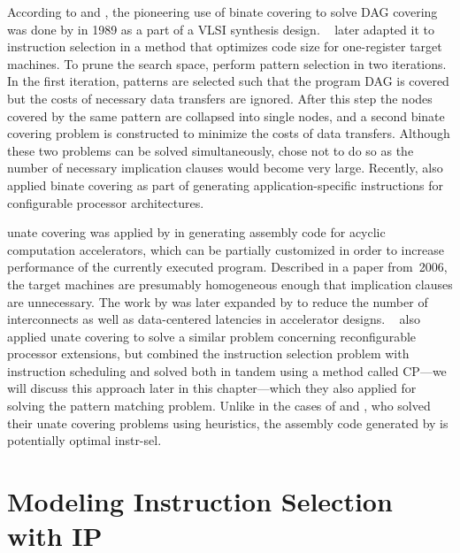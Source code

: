According to  and \textcite{Cong2004}, the
pioneering use of \gls{binate covering} to solve \gls{DAG covering} was done by
\textcite{Rudell1989} in 1989 as a part of a \gls{VLSI} synthesis
design.
%
\citeauthor{Liao1995}~\cite{Liao1995, Liao1998} later adapted it to
\gls{instruction selection} in a method that optimizes code size for
one-\gls{register} \glspl{target machine}.
%
To prune the search space,
\citeauthor{Liao1995} perform \gls{pattern selection} in two iterations.
%
In the
first iteration, \glspl{pattern} are selected such that the \gls{program DAG} is
covered but the costs of necessary data transfers are ignored.
%
After this step
the \glspl{node} covered by the same \gls{pattern} are collapsed into single
\glspl{node}, and a second \gls{binate covering} problem is constructed to
minimize the costs of data transfers.
%
Although these two problems can be solved
simultaneously, \citeauthor{Liao1995} chose not to do so as the number of
necessary \glspl{implication clause} would become very large.
%
Recently,
\textcite{Cong2004} also applied \gls{binate covering} as part of generating
application-specific \glspl{instruction} for configurable processor
architectures.

\Gls{unate covering} was applied by \textcite{Clark2006} in generating
\gls{assembly code} for acyclic computation accelerators, which can be partially
customized in order to increase performance of the currently executed
\gls{program}.
%
Described in a paper from~2006, the \glspl{target machine} are
presumably homogeneous enough that \glspl{implication clause} are
unnecessary.
%
The work by \citeauthor{Clark2006} was later expanded by
\textcite{Hormati2007} to reduce the number of interconnects as well as
data-centered latencies in accelerator
designs.
%
\citeauthor{Martin2009}~\cite{Martin2009, Martin2012} also applied
\gls{unate covering} to solve a similar problem concerning reconfigurable
processor extensions, but combined the \gls{instruction selection} problem with
\gls{instruction scheduling} and solved both in tandem using a method called
\glsdesc{CP}---we will discuss this approach later in this chapter---which
they also applied for solving the \gls{pattern matching} problem.
%
Unlike in the
cases of \citeauthor{Clark2006} and \citeauthor{Hormati2007}, who solved their
\gls{unate covering} problems using heuristics, the \gls{assembly code}
generated by \citeauthor{Martin2009} is potentially \gls{optimal instr-sel}.


\section{Modeling Instruction Selection with IP}

